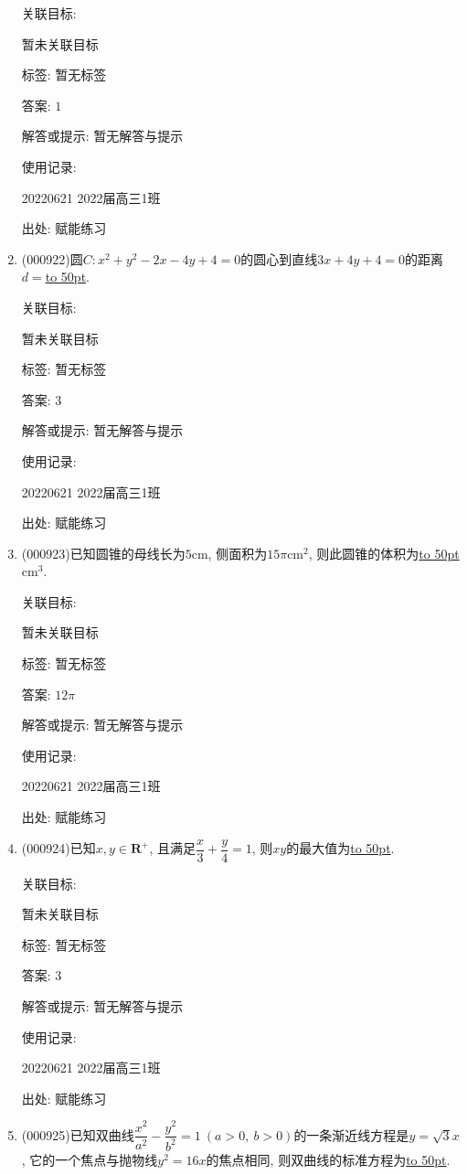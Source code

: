 \documentclass[10pt,a4paper]{article}
\newcommand{\blank}[1]{\underline{\hbox to #1pt{}}}
\begin{document}
\begin{enumerate}[1.]
关联目标:

暂未关联目标



标签: 暂无标签

答案: $1$

解答或提示: 暂无解答与提示

使用记录:

20220621	2022届高三1班	


出处: 赋能练习
\item { (000922)}圆$C:x^2+y^2-2x-4y+4=0$的圆心到直线$3x+4y+4=0$的距离$d=$\blank{50}.


关联目标:

暂未关联目标



标签: 暂无标签

答案: $3$

解答或提示: 暂无解答与提示

使用记录:

20220621	2022届高三1班	


出处: 赋能练习
\item { (000923)}已知圆锥的母线长为$5\text{cm}$, 侧面积为$15 \pi \text{cm}^2$, 则此圆锥的体积为\blank{50}$\text{cm}^3$.


关联目标:

暂未关联目标



标签: 暂无标签

答案: $12\pi$

解答或提示: 暂无解答与提示

使用记录:

20220621	2022届高三1班	


出处: 赋能练习
\item { (000924)}已知$x,y\in \mathbf{R}^+$, 且满足$\dfrac x3+\dfrac y4=1$, 则$xy$的最大值为\blank{50}.


关联目标:

暂未关联目标



标签: 暂无标签

答案: $3$

解答或提示: 暂无解答与提示

使用记录:

20220621	2022届高三1班	


出处: 赋能练习
\item { (000925)}已知双曲线$\dfrac{x^2}{a^2}-\dfrac{y^2}{b^2}=1 \ (a>0,\ b>0)$的一条渐近线方程是$y=\sqrt3x$, 它的一个焦点与抛物线$y^2=16x$的焦点相同, 则双曲线的标准方程为\blank{50}.



\end{enumerate}
\end{document}

